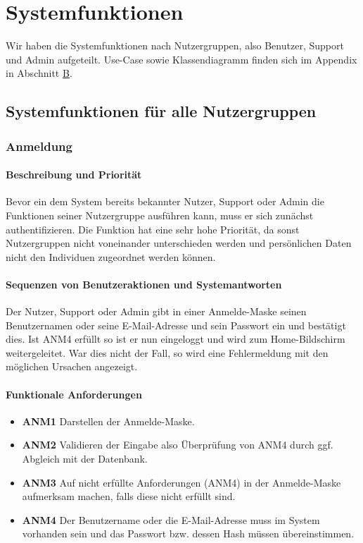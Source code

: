 \section{Systemfunktionen}
\label{system_features}

Wir haben die Systemfunktionen nach Nutzergruppen, also Benutzer, Support und Admin aufgeteilt. Use-Case sowie Klassendiagramm finden sich im Appendix in Abschnitt \hyperref[sec:app_modelle]{B}.

\subsection{Systemfunktionen für alle Nutzergruppen}
\subsubsection{Anmeldung}
\paragraph{Beschreibung und Priorität}

Bevor ein dem System bereits bekannter Nutzer, Support oder Admin die Funktionen seiner Nutzergruppe ausführen kann,
muss er sich zunächst authentifizieren.
Die Funktion hat eine sehr hohe Priorität, da sonst Nutzergruppen nicht voneinander unterschieden werden und persönlichen Daten nicht den Individuen zugeordnet werden können.

\paragraph{Sequenzen von Benutzeraktionen und Systemantworten}

Der Nutzer, Support oder Admin gibt in einer Anmelde-Maske seinen Benutzernamen oder seine E-Mail-Adresse und sein Passwort ein
und bestätigt dies.
Ist ANM4 erfüllt so ist er nun eingeloggt und wird zum Home-Bildschirm weitergeleitet.
War dies nicht der Fall, so wird eine Fehlermeldung mit den möglichen Ursachen angezeigt.

\paragraph{Funktionale Anforderungen}
\begin{itemize}
	\item \textbf{ANM1} Darstellen der Anmelde-Maske.
	\item \textbf{ANM2} Validieren der Eingabe also Überprüfung von ANM4 durch ggf. Abgleich mit der Datenbank.
	\item \textbf{ANM3} Auf nicht erfüllte Anforderungen (ANM4) in der Anmelde-Maske aufmerksam machen,
	      falls diese nicht erfüllt sind.
	\item \textbf{ANM4} Der Benutzername oder die E-Mail-Adresse muss im System vorhanden sein und das Passwort
	      bzw. dessen Hash müssen übereinstimmen.
\end{itemize}


